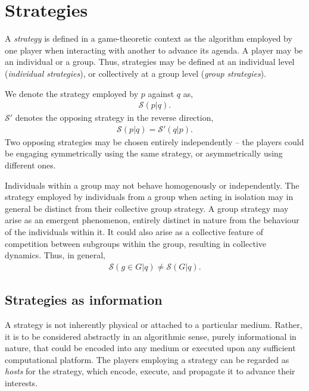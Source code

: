 \documentclass[twocolumn, aps, rmp, amsmath, amssymb, nofootinbib, superscriptaddress, longbibliography, floatfix, table-of-contents, eqsecnum]{revtex4-1}
\begin{document}
\section{Strategies}

A \textit{strategy} is defined in a game-theoretic context as the algorithm employed by one player when interacting with another to advance its agenda. A player may be an individual or a group. Thus, strategies may be defined at an individual level (\textit{individual strategies}), or collectively at a group level (\textit{group strategies}).

We denote the strategy employed by $p$ against $q$ as,
\begin{align}
	\mathcal{S}(p|q).	
\end{align}
$\mathcal{S}'$ denotes the opposing strategy in the reverse direction,
\begin{align}
	\mathcal{S}(p|q) = \mathcal{S}'(q|p).
\end{align}
Two opposing strategies may be chosen entirely independently -- the players could be engaging symmetrically using the same strategy, or asymmetrically using different ones.


Individuals within a group may not behave homogenously or independently. The strategy employed by individuals from a group when acting in isolation may in general be distinct from their collective group strategy. A group strategy may arise as an emergent phenomenon, entirely distinct in nature from the behaviour of the individuals within it. It could also arise as a collective feature of competition between subgroups within the group, resulting in collective dynamics. Thus, in general,
\begin{align}
	\mathcal{S}(g\in G|q)\neq \mathcal{S}(G|q).
\end{align}

\subsection{Strategies as information}

A strategy is not inherently physical or attached to a particular medium. Rather, it is to be considered abstractly in an algorithmic sense, purely informational in nature, that could be encoded into any medium or executed upon any sufficient computational platform. The players employing a strategy can be regarded as \textit{hosts} for the strategy, which encode, execute, and propagate it to advance their interests.
\end{document}

